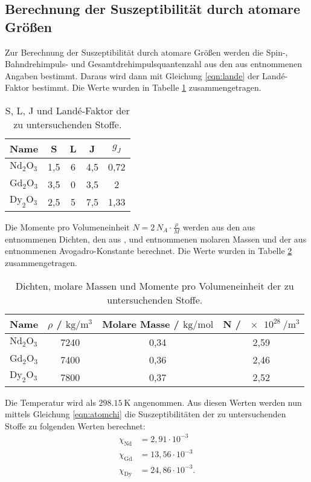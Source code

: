 \subsection{Berechnung der Suszeptibilität durch atomare Größen}
Zur Berechnung der Suszeptibilität durch atomare Größen werden die Spin-, Bahndrehimpuls- und Gesamtdrehimpulsquantenzahl aus den aus \cite{sample} entnommenen Angaben bestimmt.
Daraus wird dann mit Gleichung \eqref{eqn:lande} der Landé-Faktor bestimmt. Die Werte wurden in Tabelle \ref{tab:lande} zusammengetragen.
\begin{table}
  \centering
  \caption{S, L, J und Landé-Faktor der zu untersuchenden Stoffe.}
  \label{tab:lande}
  \begin{tabular}{l c c c c}
    \toprule
Name & S & L & J & $g_J$ \\
    \midrule
  $\text{Nd}_2 \text{O}_3$ & 1,5 & 6 & 4,5 & 0,72 \\
  $\text{Gd}_2 \text{O}_3$ & 3,5 & 0 & 3,5 & 2 \\
  $\text{Dy}_2 \text{O}_3$ & 2,5 & 5 & 7,5 & 1,33 \\
  \bottomrule
  \end{tabular}
\end{table}
Die Momente pro Volumeneinheit $N=2 \, N_A \cdot \frac{\rho}{M}$ werden aus den aus \cite{sample} entnommenen Dichten, den aus \cite{dy}, \cite{gd} und \cite{nd} entnommenen molaren Massen und der
aus \cite{scipy} entnommenen Avogadro-Konstante berechnet. Die Werte wurden in Tabelle \ref{tab:N} zusammengetragen.
\begin{table}
  \centering
  \caption{Dichten, molare Massen und Momente pro Volumeneinheit der zu untersuchenden Stoffe.}
  \label{tab:N}
  \begin{tabular}{l c c c}
    \toprule
Name & $\rho$ / $\si{\kilo\gram\per\meter\cubed}$ & Molare Masse / $\si{\kilo\gram\per\mol}$ & N / $\SI{e28}{\per\meter\cubed}$ \\
    \midrule
  $\text{Nd}_2 \text{O}_3$ & 7240 & 0,34 & 2,59\\
  $\text{Gd}_2 \text{O}_3$ & 7400 & 0,36 & 2,46\\
  $\text{Dy}_2 \text{O}_3$ & 7800 & 0,37 & 2,52 \\
  \bottomrule
  \end{tabular}
\end{table}
Die Temperatur wird als $\SI{298.15}{\kelvin}$ angenommen.
Aus diesen Werten werden nun mittels Gleichung \eqref{eqn:atomchi} die Suszeptibilitäten der zu untersuchenden Stoffe zu folgenden Werten berechnet:
\begin{align*}
  \chi_\text{Nd} &= 2,91\cdot10^{-3} \\
  \chi_\text{Gd} &= 13,56\cdot10^{-3}\\
  \chi_\text{Dy} &= 24,86\cdot10^{-3} .
\end{align*}
